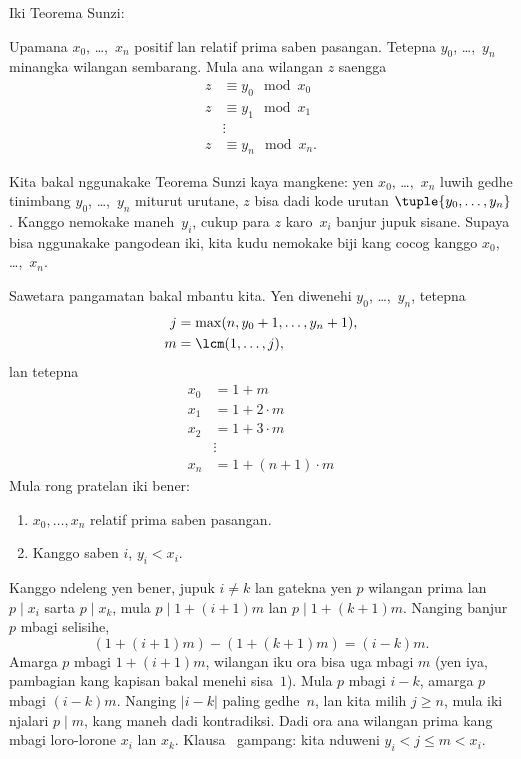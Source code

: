 \documentclass[../../../include/open-logic-section]{subfiles}
\begin{document}
Iki Teorema Sunzi:
\begin{thm}
Upamana $x_0$, \dots,~$x_n$ positif lan relatif prima saben pasangan. Tetepna
$y_0$, \dots,~$y_n$ minangka wilangan sembarang. Mula ana wilangan $z$ saengga
\begin{align*}
z & \equiv y_0 \mod x_0 \\
z & \equiv y_1 \mod x_1 \\
& \vdots  \\
z & \equiv y_n \mod x_n.
\end{align*}
\end{thm}

Kita bakal nggunakake Teorema Sunzi kaya mangkene: yen $x_0$,
\dots,~$x_n$ luwih gedhe tinimbang $y_0$, \dots,~$y_n$ miturut
urutane, $z$ bisa dadi kode urutan $\tuple{y_0, \dots,y_n}$. Kanggo
nemokake maneh~$y_i$, cukup para $z$ karo~$x_i$ banjur jupuk
sisane. Supaya bisa nggunakake pangodean iki, kita kudu nemokake
biji kang cocog kanggo $x_0$, \dots,~$x_n$.

Sawetara pangamatan bakal mbantu kita. Yen diwenehi
$y_0$, \dots,~$y_n$, tetepna
\begin{align*}
j &= \max(n, y_0 + 1, \dots, y_n + 1), \\
m &= \lcm(1,\dots,j),
\end{align*}
lan tetepna
\begin{align*}
x_0 & = 1 + m \\
x_1 & = 1 + 2 \cdot m \\
x_2 & = 1 + 3 \cdot m \\
& \vdots  \\
x_n & = 1 + (n+1) \cdot m
\end{align*}
Mula rong pratelan iki bener:
\begin{enumerate}
\item{} $x_0,\dots,x_n$ relatif prima saben pasangan.
\item{} Kanggo saben $i$, $y_i < x_i$.
\end{enumerate}
Kanggo ndeleng yen  bener, jupuk $i\ne k$ lan gatekna yen $p$ wilangan prima
lan $p \mid x_i$ sarta $p \mid x_k$, mula $p \mid 1 + (i+1) m$ lan
$p \mid 1 + (k+1) m$. Nanging banjur $p$ mbagi selisihe,
\[
(1 + (i+1)m) - (1+ (k+1)m) = (i-k) m.
\]
Amarga $p$ mbagi $1 + (i+1)m$, wilangan iku ora bisa uga mbagi $m$
(yen iya, pambagian kang kapisan bakal menehi sisa~$1$). Mula $p$
mbagi $i-k$, amarga $p$ mbagi $(i-k)m$. Nanging $\left|i-k\right|$ paling
gedhe~$n$, lan kita milih $j \geq n$, mula iki njalari
$p \mid m$, kang maneh dadi kontradiksi. Dadi ora ana wilangan prima kang
mbagi loro-lorone $x_i$ lan $x_k$. Klausa~ gampang:
kita nduweni $y_i < j \leq m < x_i$.
\end{document}
